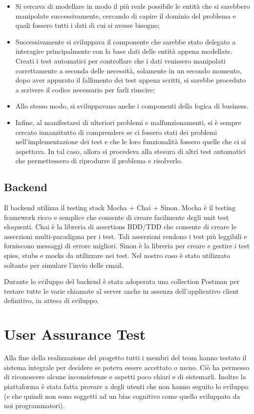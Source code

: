 \begin{itemize}

    \item Si cercava di modellare in modo il più reale possibile le entità che si sarebbero manipolate successivamente, cercando di capire il dominio del problema e quali fossero tutti i dati di cui si avesse bisogno;
    
    \item Successivamente si sviluppava il componente che sarebbe stato delegato a interagire principalmente con la base dati delle entità appena modellate. Creati i test automatici per controllare che i dati venissero manipolati correttamente a seconda delle necessità, solamente in un secondo momento, dopo aver appurato il fallimento dei test appena scritti, si sarebbe proceduto a scrivere il codice necessario per farli riuscire;
    
    \item Allo stesso modo, si sviluppavano anche i componenti della logica di business.
    
    \item Infine, al manifestarsi di ulteriori problemi e malfunzionamenti, si è sempre cercato innanzitutto di comprendere se ci fossero stati dei problemi nell'implementazione dei test e che le loro funzionalità fossero quelle che ci si aspettava. In tal caso, allora si procedeva alla stesura di altri test automatici che permettessero di riprodurre il problema e risolverlo.
    
\end{itemize}

 \subsection{Backend}
 
 Il backend utilizza il testing stack Mocha + Chai + Sinon. 
Mocha è il testing framework ricco e semplice che consente di creare facilmente degli unit test eloquenti. Chai è la libreria di assertions BDD/TDD che consente di creare le asserzioni multi-paradigma per i test. Tali asserzioni rendono i test più leggibili e forniscono messaggi di errore migliori. 
Sinon è la libreria per creare e gestire i test spies, stubs e mocks da utilizzare nei test. Nel nostro caso è stato utilizzato soltanto per simulare l'invio delle email.

Durante lo sviluppo del backend è stata adoperata una collection Postman per testare tutte le varie chiamate al server anche in assenza dell'applicativo client definitivo, in attesa di sviluppo. 

\section{User Assurance Test}

Alla fine della realizzazione del progetto tutti i membri del team hanno testato il sistema integrale per decidere se poteva essere accettato o meno. Ciò ha permesso di riconoscere alcune inconsistenze e aspetti poco chiari e di sistemarli. Inoltre la piattaforma è stata fatta provare a degli utenti che non hanno seguito lo sviluppo (e che quindi non sono soggetti ad un bias cognitivo come quello sviluppato da noi programmatori).